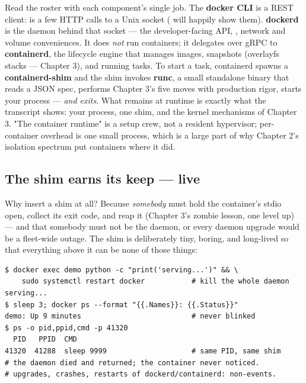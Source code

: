 Read the roster with each component's single job. The \textbf{docker CLI} is a REST client:  is a few HTTP calls to a Unix socket ( will happily show them). \textbf{dockerd} is the daemon behind that socket — the developer-facing API, , network and volume conveniences. It does \textit{not} run containers; it delegates over gRPC to \textbf{containerd}, the lifecycle engine that manages images, snapshots (overlayfs stacks — Chapter 3), and running tasks. To start a task, containerd spawns a \textbf{containerd-shim} and the shim invokes \textbf{runc}, a small standalone binary that reads a JSON spec, performs Chapter 3's five moves with production rigor, starts your process — \textit{and exits}. What remains at runtime is exactly what the transcript shows: your process, one shim, and the kernel mechanisms of Chapter 3. "The container runtime" is a setup crew, not a resident hypervisor; per-container overhead is one small process, which is a large part of why Chapter 2's isolation spectrum put containers where it did.

\subsection*{The shim earns its keep — live}

Why insert a shim at all? Because \textit{somebody} must hold the container's stdio open, collect its exit code, and reap it (Chapter 3's zombie lesson, one level up) — and that somebody must not be the daemon, or every daemon upgrade would be a fleet-wide outage. The shim is deliberately tiny, boring, and long-lived so that everything above it can be none of those things:

\begin{terminalbox}
\begin{Verbatim}[breaklines=true,breakanywhere=true,fontsize=\small,formatcom=\color{tbbtermfg},codes=\tbbcodeactive]
$ docker exec demo python -c "print('serving...')" && \
    sudo systemctl restart docker           # kill the whole daemon
serving...
$ sleep 3; docker ps --format "{{.Names}}: {{.Status}}"
demo: Up 9 minutes                          # never blinked
$ ps -o pid,ppid,cmd -p 41320
  PID   PPID  CMD
41320  41288  sleep 9999                    # same PID, same shim
# the daemon died and returned; the container never noticed.
# upgrades, crashes, restarts of dockerd/containerd: non-events.
\end{Verbatim}
\end{terminalbox}

